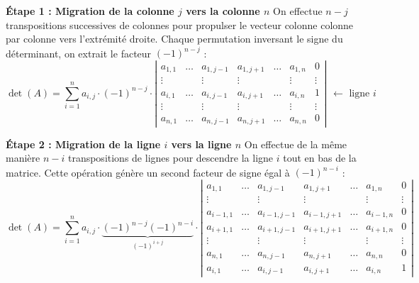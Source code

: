 \documentclass[11pt, a4paper]{article}
\theoremstyle{definition}
\begin{document}
\begin{outline}
	\1 \textbf{Étape 1 : Migration de la colonne $j$ vers la colonne $n$}
	\2 On effectue $n-j$ transpositions successives de colonnes pour propulser le vecteur colonne colonne par colonne vers l'extrémité droite. Chaque permutation inversant le signe du déterminant, on extrait le facteur $(-1)^{n-j}$ :
	$$\det(A) = \sum_{i=1}^n a_{i,j} \cdot (-1)^{n-j} \cdot \left|\begin{matrix} 
		a_{1,1} & \dots & a_{1,j-1} & a_{1,j+1} & \dots & a_{1,n} & 0 \\
		\vdots & & \vdots & \vdots & & \vdots & \vdots \\
		a_{i,1} & \dots & a_{i,j-1} & a_{i,j+1} & \dots & a_{i,n} & 1 \\
		\vdots & & \vdots & \vdots & & \vdots & \vdots \\
		a_{n,1} & \dots & a_{n,j-1} & a_{n,j+1} & \dots & a_{n,n} & 0
	\end{matrix}\right| \begin{matrix} \ \\ \ \\ \leftarrow \text{ ligne } i \\ \ \\ \ \end{matrix}$$

	\1 \textbf{Étape 2 : Migration de la ligne $i$ vers la ligne $n$}
	\2 On effectue de la même manière $n-i$ transpositions de lignes pour descendre la ligne $i$ tout en bas de la matrice. Cette opération génère un second facteur de signe égal à $(-1)^{n-i}$ :
	$$\det(A) = \sum_{i=1}^n a_{i,j} \cdot \underbrace{(-1)^{n-j} (-1)^{n-i}}_{(-1)^{i+j}} \cdot \left|\begin{matrix} 
		a_{1,1} & \dots & a_{1,j-1} & a_{1,j+1} & \dots & a_{1,n} & 0 \\
		\vdots & & \vdots & \vdots & & \vdots & \vdots \\
		a_{i-1,1} & \dots & a_{i-1,j-1} & a_{i-1,j+1} & \dots & a_{i-1,n} & 0 \\
		a_{i+1,1} & \dots & a_{i+1,j-1} & a_{i+1,j+1} & \dots & a_{i+1,n} & 0 \\
		\vdots & & \vdots & \vdots & & \vdots & \vdots \\
		a_{n,1} & \dots & a_{n,j-1} & a_{n,j+1} & \dots & a_{n,n} & 0 \\
		a_{i,1} & \dots & a_{i,j-1} & a_{i,j+1} & \dots & a_{i,n} & 1
	\end{matrix}\right|$$
\end{outline}
\end{document}
